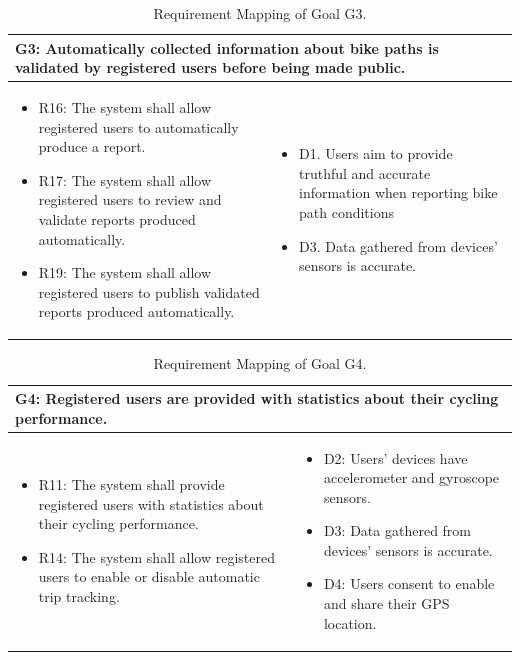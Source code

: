 \begin{table}[H]
    \renewcommand{\arraystretch}{1.3}
    \begin{tabularx}{\textwidth}{|X|X|}
    \hline
    \multicolumn{2}{|p{0.95\textwidth}|}{G3: Automatically collected information about bike paths is validated by registered users before being made public.} \\ \hline
    \begin{itemize}[topsep=0pt, partopsep=0pt, leftmargin=*]
        \item R16: The system shall allow registered users to automatically produce a report.
        \item R17: The system shall allow registered users to review and validate reports produced automatically.
        \item R19: The system shall allow registered users to publish validated reports produced automatically.
    \end{itemize} & \begin{itemize}[topsep=0pt, partopsep=0pt, leftmargin=*]
        \item D1. Users aim to provide truthful and accurate information when reporting bike path conditions
        \item D3. Data gathered from devices’ sensors is accurate.
    \end{itemize} \\ \hline
    \end{tabularx}
    \caption{Requirement Mapping of Goal G3.}
    \label{tab:rm_g3}
\end{table}

\begin{table}[H]
    \renewcommand{\arraystretch}{1.3}
    \begin{tabularx}{\textwidth}{|X|X|}
    \hline
    \multicolumn{2}{|p{0.95\textwidth}|}{G4: Registered users are provided with statistics about their cycling performance.} \\ \hline
    \begin{itemize}[topsep=0pt, partopsep=0pt, leftmargin=*]
        \item R11: The system shall provide registered users with statistics about their cycling performance.
        \item R14: The system shall allow registered users to enable or disable automatic trip tracking.
    \end{itemize} & \begin{itemize}[topsep=0pt, partopsep=0pt, leftmargin=*]
        \item D2: Users’ devices have accelerometer and gyroscope sensors.
        \item D3: Data gathered from devices’ sensors is accurate.
        \item D4: Users consent to enable and share their GPS location.
    \end{itemize} \\ \hline
    \end{tabularx}
    \caption{Requirement Mapping of Goal G4.}
    \label{tab:rm_g4}
\end{table}

